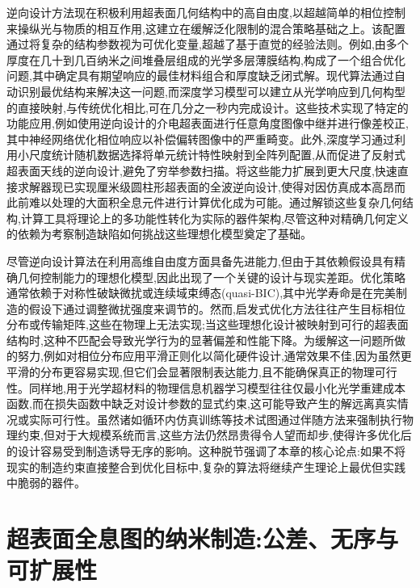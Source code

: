 逆向设计方法现在积极利用超表面几何结构中的高自由度,以超越简单的相位控制来操纵光与物质的相互作用,这建立在缓解泛化限制的混合策略基础之上。该配置通过将复杂的结构参数视为可优化变量,超越了基于直觉的经验法则。例如,由多个厚度在几十到几百纳米之间堆叠层组成的光学多层薄膜结构,构成了一个组合优化问题,其中确定具有期望响应的最佳材料组合和厚度缺乏闭式解。现代算法通过自动识别最优结构来解决这一问题,而深度学习模型可以建立从光学响应到几何构型的直接映射,与传统优化相比,可在几分之一秒内完成设计。这些技术实现了特定的功能应用,例如使用逆向设计的介电超表面进行任意角度图像中继并进行像差校正,其中神经网络优化相位响应以补偿偏转图像中的严重畸变。此外,深度学习通过利用小尺度统计随机数据选择将单元统计特性映射到全阵列配置,从而促进了反射式超表面天线的逆向设计,避免了穷举参数扫描。将这些能力扩展到更大尺度,快速直接求解器现已实现厘米级圆柱形超表面的全波逆向设计,使得对因仿真成本高昂而此前难以处理的大面积全息元件进行计算优化成为可能。通过解锁这些复杂几何结构,计算工具将理论上的多功能性转化为实际的器件架构,尽管这种对精确几何定义的依赖为考察制造缺陷如何挑战这些理想化模型奠定了基础。\citep{doi_10_1016_j_isci_2025_112222_1f7c10f5} \citep{doi_10_1364_oe_519179_39046c11} \citep{doi_10_1002_mop_34068_b2e55b41} \citep{doi_10_1515_nanoph_2024_0127_c4fd5a12}

尽管逆向设计算法在利用高维自由度方面具备先进能力,但由于其依赖假设具有精确几何控制能力的理想化模型,因此出现了一个关键的设计与现实差距。优化策略通常依赖于对称性破缺微扰或连续域束缚态(quasi-BIC),其中光学寿命是在完美制造的假设下通过调整微扰强度来调节的。然而,启发式优化方法往往产生目标相位分布或传输矩阵,这些在物理上无法实现;当这些理想化设计被映射到可行的超表面结构时,这种不匹配会导致光学行为的显著偏差和性能下降。为缓解这一问题所做的努力,例如对相位分布应用平滑正则化以简化硬件设计,通常效果不佳,因为虽然更平滑的分布更容易实现,但它们会显著限制表达能力,且不能确保真正的物理可行性。同样地,用于光学超材料的物理信息机器学习模型往往仅最小化光学重建成本函数,而在损失函数中缺乏对设计参数的显式约束,这可能导致产生的解远离真实情况或实际可行性。虽然诸如循环内仿真训练等技术试图通过伴随方法来强制执行物理约束,但对于大规模系统而言,这些方法仍然昂贵得令人望而却步,使得许多优化后的设计容易受到制造诱导无序的影响。这种脱节强调了本章的核心论点:如果不将现实的制造约束直接整合到优化目标中,复杂的算法将继续产生理论上最优但实践中脆弱的器件。\citep{doi_10_1103_physrevapplied_21_044004_d1b93ffe} \citep{doi_10_48550_arxiv_2505_18377_a6fc9ec3} \citep{doi_10_1002_adpr_202300158_66d61883}

\section{超表面全息图的纳米制造:公差、无序与可扩展性}\label{ux8d85ux8868ux9762ux5168ux606fux56feux7684ux7eb3ux7c73ux5236ux9020ux516cux5deeux65e0ux5e8fux4e0eux53efux6269ux5c55ux6027}

